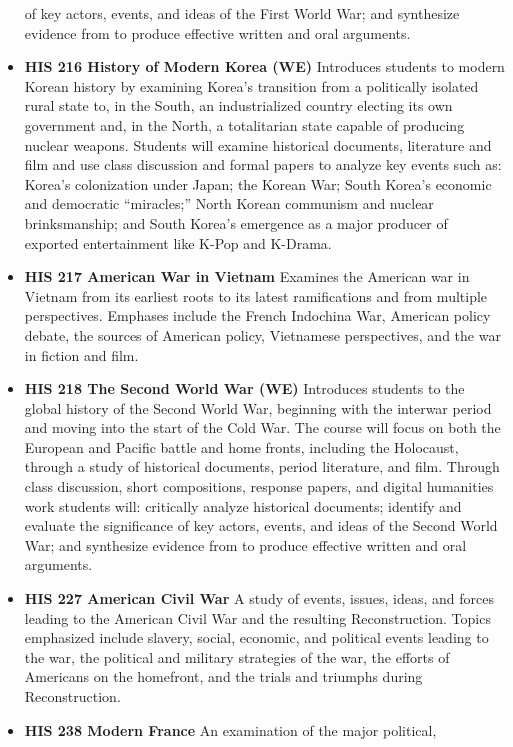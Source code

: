\documentclass[
  letterpaper,
]{scrbook}
\begin{document}
\begin{itemize}
  of key actors, events, and ideas of the First World War; and
  synthesize evidence from to produce effective written and oral
  arguments.
\item
  \textbf{HIS 216 History of Modern Korea (WE)} Introduces students to
  modern Korean history by examining Korea's transition from a
  politically isolated rural state to, in the South, an industrialized
  country electing its own government and, in the North, a totalitarian
  state capable of producing nuclear weapons. Students will examine
  historical documents, literature and film and use class discussion and
  formal papers to analyze key events such as: Korea's colonization
  under Japan; the Korean War; South Korea's economic and democratic
  ``miracles;'' North Korean communism and nuclear brinksmanship; and
  South Korea's emergence as a major producer of exported entertainment
  like K-Pop and K-Drama.
\item
  \textbf{HIS 217 American War in Vietnam} Examines the American war in
  Vietnam from its earliest roots to its latest ramifications and from
  multiple perspectives. Emphases include the French Indochina War,
  American policy debate, the sources of American policy, Vietnamese
  perspectives, and the war in fiction and film.
\item
  \textbf{HIS 218 The Second World War (WE)} Introduces students to the
  global history of the Second World War, beginning with the interwar
  period and moving into the start of the Cold War. The course will
  focus on both the European and Pacific battle and home fronts,
  including the Holocaust, through a study of historical documents,
  period literature, and film. Through class discussion, short
  compositions, response papers, and digital humanities work students
  will: critically analyze historical documents; identify and evaluate
  the significance of key actors, events, and ideas of the Second World
  War; and synthesize evidence from to produce effective written and
  oral arguments.
\item
  \textbf{HIS 227 American Civil War} A study of events, issues, ideas,
  and forces leading to the American Civil War and the resulting
  Reconstruction. Topics emphasized include slavery, social, economic,
  and political events leading to the war, the political and military
  strategies of the war, the efforts of Americans on the homefront, and
  the trials and triumphs during Reconstruction.
\item
  \textbf{HIS 238 Modern France} An examination of the major political,

\end{itemize}
\end{document}
